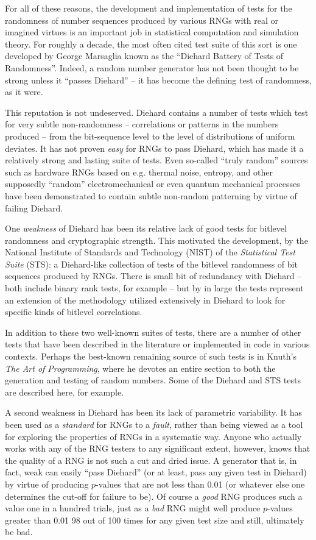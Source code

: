 \documentclass{book}
\begin{document}
For all of these reasons, the development and implementation of tests
for the randomness of number sequences produced by various RNGs with
real or imagined virtues is an important job in statistical computation
and simulation theory.  For roughly a decade, the most often cited test
suite of this sort is one developed by George Marsaglia known as the
``Diehard Battery of Tests of Randomness''\cite{Marsaglia}.  Indeed, a
random number generator has not been thought to be strong unless it
``passes Diehard'' -- it has become the defining test of randomness, as
it were.

This reputation is not undeserved.  Diehard contains a number of tests
which test for very subtle non-randomness -- correlations or patterns in
the numbers produced -- from the bit-sequence level to the level of
distributions of uniform deviates.  It has not proven {\em easy} for
RNGs to pass Diehard, which has made it a relatively strong and lasting
suite of tests.  Even so-called ``truly random'' sources such as
hardware RNGs based on e.g. thermal noise, entropy, and other supposedly
``random'' electromechanical or even quantum mechanical processes have
been demonstrated to contain subtle non-random patterning by virtue of
failing Diehard.

One {\em weakness} of Diehard has been its relative lack of good tests
for bitlevel randomness and cryptographic strength.  This motivated the
development, by the National Institute of Standards and Technology
(NIST) of the {\em Statistical Test Suite} (STS): a Diehard-like
collection of tests of the bitlevel randomness of bit sequences produced
by RNGs\cite{STS}.  There is small bit of redundancy with Diehard --
both include binary rank tests, for example -- but by in large the tests
represent an extension of the methodology utilized extensively in
Diehard to look for specific kinds of bitlevel correlations.

In addition to these two well-known suites of tests, there are a number
of other tests that have been described in the literature or implemented
in code in various contexts.  Perhaps the best-known remaining source of
such tests is in Knuth's {\em The Art of Programming}\cite{Knuth}, where
he devotes an entire section to both the generation and testing of
random numbers.  Some of the Diehard and STS tests are described here,
for example.

A second weakness in Diehard has been its lack of parametric
variability.  It has been used as a {\em standard} for RNGs to a {\em
fault}, rather than being viewed as a tool for exploring the properties
of RNGs in a systematic way.  Anyone who actually works with any of the
RNG testers to any significant extent, however, knows that the quality
of a RNG is not such a cut and dried issue.  A generator that is, in
fact, weak can easily ``pass Diehard'' (or at least, pass any given test
in Diehard) by virtue of producing $p$-values that are not less than
0.01 (or whatever else one determines the cut-off for failure to be).
Of course a {\em good} RNG produces such a value one in a hundred
trials, just as a {\em bad} RNG might well produce $p$-values greater
than 0.01 98 out of 100 times for any given test size and still,
ultimately be bad.
\end{document}
